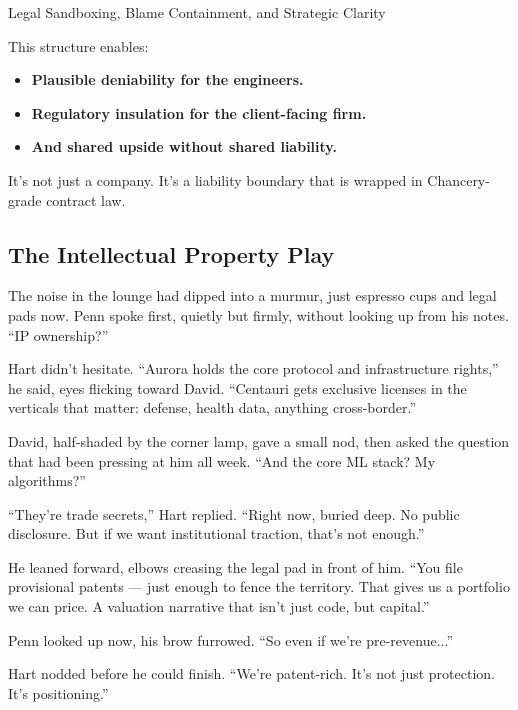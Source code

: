 \begin{TechnicalSidebar}{Legal Sandboxing, Blame Containment, and Strategic Clarity}
  \medskip
  
  This structure enables:

  \medskip
  
  \begin{itemize}
  \item \textbf{Plausible deniability for the engineers.}  
  \item \textbf{Regulatory insulation for the client-facing firm.}  
  \item \textbf{And shared upside without shared liability.}
  \end{itemize}

  \medskip
  
  It’s not just a company. It’s a liability boundary that is wrapped in Chancery-grade contract law.
  
\end{TechnicalSidebar}

\medskip

\subsection{The Intellectual Property Play}

The noise in the lounge had dipped into a murmur, just espresso cups and legal pads now. Penn spoke first, quietly but 
firmly, without looking up from his notes. “IP ownership?”

Hart didn’t hesitate. ``Aurora holds the core protocol and infrastructure rights,” he said, eyes flicking toward David. 
“Centauri gets exclusive licenses in the verticals that matter: defense, health data, anything cross-border.''

David, half-shaded by the corner lamp, gave a small nod, then asked the question that had been pressing at him all week. 
``And the core ML stack? My algorithms?''

``They’re trade secrets,'' Hart replied. ``Right now, buried deep. No public disclosure. But if we want institutional traction, 
that’s not enough.''

He leaned forward, elbows creasing the legal pad in front of him. ``You file provisional patents — just enough to fence the 
territory. That gives us a portfolio we can price. A valuation narrative that isn’t just code, but capital.''

Penn looked up now, his brow furrowed. ``So even if we’re pre-revenue...''

Hart nodded before he could finish. ``We’re patent-rich. It’s not just protection. It’s positioning.''

